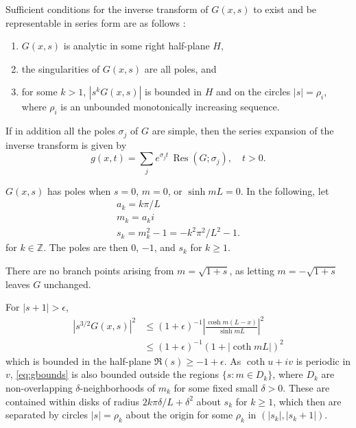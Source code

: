 \documentclass[parskip=half]{scrartcl}
\DeclareMathOperator{\Res}{Res}
\begin{document}
Sufficient conditions for the inverse transform of $G(x,s)$ to exist
and be representable in series form are as follows
\parencite[][Theorem 4]{churchill1937}:
\begin{enumerate}
\item
    $G(x, s)$ is analytic in some right half-plane $H$,
\item
    the singularities of $G(x, s)$ are all poles, and
\item for some $k>1$, $|s^k G(x, s)|$ is bounded in $H$ and
    on the circles $|s|=\rho_i$, where $\rho_i$ is an unbounded monotonically
    increasing sequence.
\end{enumerate}
If in addition all the poles $\sigma_j$ of $G$ are simple, then
the series expansion of the inverse transform is given by
\begin{equation}
    g(x,t) = \sum_j e^{\sigma_j t}\, \Res(G;\sigma_j),\quad t>0.
\end{equation}

$G(x,s)$ has poles when $s=0$, $m=0$, or $\sinh mL=0$.
In the following, let
\begin{gather*}
    a_k = k\pi /L\\
    m_k = a_k i\\
    s_k = m_k^2 -1 = -k^2\pi^2/L^2-1.
\end{gather*}
for $k\in\mathbb{Z}$.
The poles are then $0$, $-1$, and $s_k$ for $k\geq 1$.

There are no branch points
arising from $m=\sqrt{1+s}$, as letting $m=-\sqrt{1+s}$ leaves $G$ unchanged.

For $|s+1|>\epsilon$,
\begin{equation}
    \begin{aligned}
        |s^{3/2}G(x,s)|^2
            & \leq (1+\epsilon)^{-1} \left| \frac{\cosh m(L-x)}{\sinh mL} \right|^2
        \\
            & \leq (1+\epsilon)^{-1} (1+|\coth mL|)^2
    \label{eq:gbounds}
    \end{aligned}
\end{equation}
which is bounded in the half-plane $\Re(s) \geq  -1+\epsilon$. 
As $\coth u+iv$ is periodic in $v$, \eqref{eq:gbounds} is also bounded outside
the regions $\{s: m\in D_k\}$, where $D_k$ are non-overlapping $\delta$-neighborhoods of $m_k$
for some fixed small $\delta>0$. These are contained within disks of radius
$2k\pi\delta/L+\delta^2$ about $s_k$ for $k\geq 1$, which then are separated by
circles $|s|=\rho_k$ about the origin for some $\rho_k$ in $(|s_k|, |s_k+1|)$.
\end{document}
